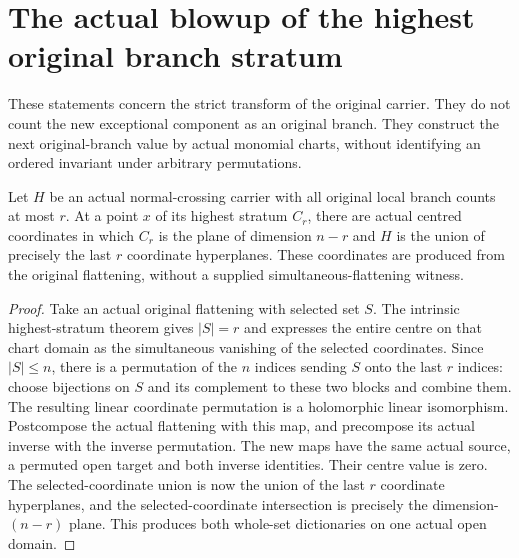 \section{The actual blowup of the highest original branch stratum}
\label{sec:hironaka-normal-crossings-highest-stratum-blowup}

These statements concern the strict transform of the original carrier.
They do not count the new exceptional component as an original branch.
They construct the next original-branch value by actual monomial charts,
without identifying an ordered invariant under arbitrary permutations.

\begin{lemma}
\label{hir:general-nc-highest-stratum-branch-adapted-coordinates}
\leanok
Let $H$ be an actual normal-crossing carrier with all original local
branch counts at most $r$. At a point $x$ of its highest stratum $C_r$,
there are actual centred coordinates in which $C_r$ is the plane of
dimension $n-r$ and $H$ is the union of precisely the last $r$
coordinate hyperplanes. These coordinates are produced from the original
flattening, without a supplied simultaneous-flattening witness.
\end{lemma}
\begin{proof}
Take an actual original flattening with selected set $S$. The intrinsic
highest-stratum theorem gives $|S|=r$ and expresses the entire centre
on that chart domain as the simultaneous vanishing of the selected
coordinates. Since $|S|\le n$, there is a permutation of the $n$
indices sending $S$ onto the last $r$ indices: choose bijections on $S$
and its complement to these two blocks and combine them. The resulting
linear coordinate permutation is a holomorphic linear isomorphism.
Postcompose the actual flattening with this map, and precompose its
actual inverse with the inverse permutation. The new maps have the
same actual source, a permuted open target and both inverse identities.
Their centre value is zero. The selected-coordinate union is now the
union of the last $r$ coordinate hyperplanes, and the selected-coordinate
intersection is precisely the dimension-$(n-r)$ plane. This produces
both whole-set dictionaries on one actual open domain.
\end{proof}

